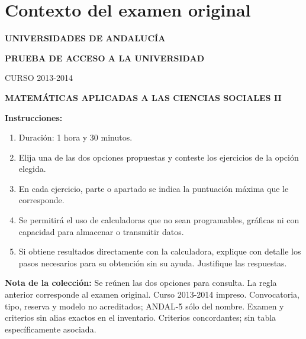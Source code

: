 \section*{Contexto del examen original}
\textbf{UNIVERSIDADES DE ANDALUCÍA}\par
\textbf{PRUEBA DE ACCESO A LA UNIVERSIDAD}\par
CURSO 2013-2014\par
\textbf{MATEMÁTICAS APLICADAS A LAS CIENCIAS SOCIALES II}

\textbf{Instrucciones:}
\begin{enumerate}[label=\textbf{\alph*)}]
  \item Duración: 1 hora y 30 minutos.
  \item Elija una de las dos opciones propuestas y conteste los ejercicios de la opción elegida.
  \item En cada ejercicio, parte o apartado se indica la puntuación máxima que le corresponde.
  \item Se permitirá el uso de calculadoras que no sean programables, gráficas ni con capacidad para almacenar o transmitir datos.
  \item Si obtiene resultados directamente con la calculadora, explique con detalle los pasos necesarios para su obtención sin su ayuda. Justifique las respuestas.
\end{enumerate}
\noindent\textbf{Nota de la colección:} Se reúnen las dos opciones para consulta. La regla anterior corresponde al examen original. Curso 2013-2014 impreso. Convocatoria, tipo, reserva y modelo no acreditados; ANDAL-5 sólo del nombre. Examen y criterios sin alias exactos en el inventario. Criterios concordantes; sin tabla específicamente asociada.
\par\medskip
